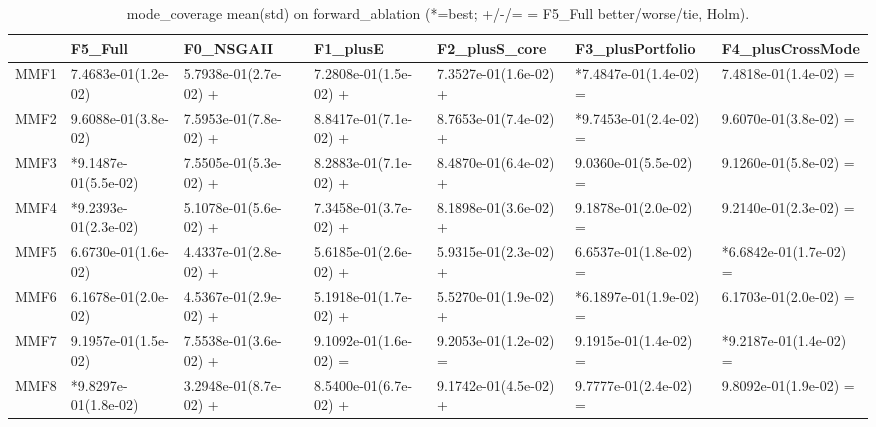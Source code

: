 \begin{table}[t]
\centering
\caption{mode_coverage mean(std) on forward_ablation (*=best; +/-/= = F5_Full better/worse/tie, Holm).}
\label{tab:forward_ablation_mode_coverage}
\begin{tabular}{lllllll}
\toprule
 & F5\_Full & F0\_NSGAII & F1\_plusE & F2\_plusS\_core & F3\_plusPortfolio & F4\_plusCrossMode \\
\midrule
MMF1 & 7.4683e-01(1.2e-02) & 5.7938e-01(2.7e-02) + & 7.2808e-01(1.5e-02) + & 7.3527e-01(1.6e-02) + & *7.4847e-01(1.4e-02) = & 7.4818e-01(1.4e-02) = \\
MMF2 & 9.6088e-01(3.8e-02) & 7.5953e-01(7.8e-02) + & 8.8417e-01(7.1e-02) + & 8.7653e-01(7.4e-02) + & *9.7453e-01(2.4e-02) = & 9.6070e-01(3.8e-02) = \\
MMF3 & *9.1487e-01(5.5e-02) & 7.5505e-01(5.3e-02) + & 8.2883e-01(7.1e-02) + & 8.4870e-01(6.4e-02) + & 9.0360e-01(5.5e-02) = & 9.1260e-01(5.8e-02) = \\
MMF4 & *9.2393e-01(2.3e-02) & 5.1078e-01(5.6e-02) + & 7.3458e-01(3.7e-02) + & 8.1898e-01(3.6e-02) + & 9.1878e-01(2.0e-02) = & 9.2140e-01(2.3e-02) = \\
MMF5 & 6.6730e-01(1.6e-02) & 4.4337e-01(2.8e-02) + & 5.6185e-01(2.6e-02) + & 5.9315e-01(2.3e-02) + & 6.6537e-01(1.8e-02) = & *6.6842e-01(1.7e-02) = \\
MMF6 & 6.1678e-01(2.0e-02) & 4.5367e-01(2.9e-02) + & 5.1918e-01(1.7e-02) + & 5.5270e-01(1.9e-02) + & *6.1897e-01(1.9e-02) = & 6.1703e-01(2.0e-02) = \\
MMF7 & 9.1957e-01(1.5e-02) & 7.5538e-01(3.6e-02) + & 9.1092e-01(1.6e-02) = & 9.2053e-01(1.2e-02) = & 9.1915e-01(1.4e-02) = & *9.2187e-01(1.4e-02) = \\
MMF8 & *9.8297e-01(1.8e-02) & 3.2948e-01(8.7e-02) + & 8.5400e-01(6.7e-02) + & 9.1742e-01(4.5e-02) + & 9.7777e-01(2.4e-02) = & 9.8092e-01(1.9e-02) = \\
\bottomrule
\end{tabular}
\end{table}
